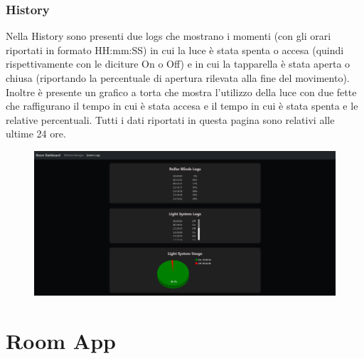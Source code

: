 \documentclass[12pt]{article}
\begin{document}
\subsubsection{History}
Nella History sono presenti due logs che mostrano i momenti (con gli orari riportati in formato HH:mm:SS) in cui la luce è stata spenta o accesa (quindi rispettivamente con le diciture On o Off) e in cui la tapparella è stata aperta o chiusa (riportando la percentuale di apertura rilevata alla fine del movimento).\newline
Inoltre è presente un grafico a torta che mostra l'utilizzo della luce con due fette che raffigurano il tempo in cui è stata accesa e il tempo in cui è stata spenta e le relative percentuali.\newline
Tutti i dati riportati in questa pagina sono relativi alle ultime 24 ore.\\
\begin{figure}[H]
    \includegraphics[width=17cm]{dashboard-hisotry.png}
\end{figure}
\newpage


\section{Room App}
\end{document}
